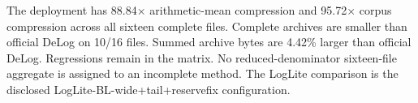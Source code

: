 The deployment has 88.84$\times$ arithmetic-mean compression and 95.72$\times$ corpus compression across all sixteen complete files.
Complete archives are smaller than official DeLog on 10/16 files. Summed archive bytes are 4.42\% larger than official DeLog. Regressions remain in the matrix.
No reduced-denominator sixteen-file aggregate is assigned to an incomplete method. The LogLite comparison is the disclosed LogLite-BL-wide+tail+reservefix configuration.
